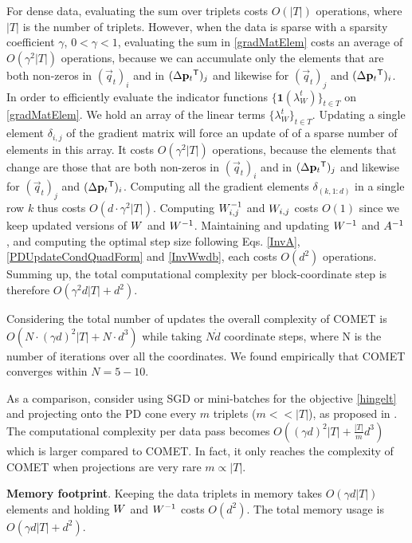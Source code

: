 \documentclass{article}
\begin{document}
For dense data, evaluating the sum over triplets costs $O(|T|)$ operations, where $|T|$ is the number of triplets. However, when the data is sparse with a sparsity coefficient $\gamma$, $ 0< \gamma <1 $, evaluating the sum in \eqref{gradMatElem} costs an average of $O(\gamma^2 |T|)$ operations, because we can accumulate only the elements that are both non-zeros in $(\vec{q}_{t})_i$ and in $(\Delta\mathbf{p}_{t}{}^\mathsf{T})_j  $ and likewise for $(\vec{q}_{t})_j$ and $(\Delta\mathbf{p}_{t}{}^\mathsf{T})_i$.   In order to efficiently evaluate the indicator functions $\{ \textbf{1}(\lambda_{W}^t) \}_{t \in T}$ on \eqref{gradMatElem}. We hold an array of the linear terms $\{\lambda_{W}^t\}_{t \in T}$. Updating a single element $\delta_{i,j}$ of the gradient matrix will force an update of of a sparse number of elements in this array. It costs $O(\gamma^2 |T|)$ operations, because the elements that change are those that are both non-zeros in $(\vec{q}_{t})_i$ and in $(\Delta\mathbf{p}_{t}{}^\mathsf{T})_j$ and likewise for $(\vec{q}_{t})_j$ and $(\Delta\mathbf{p}_{t}{}^\mathsf{T})_i$.
Computing all the gradient elements $\delta_{(k,1:d)}$ in a single row $k$ thus costs $O(d\cdot \gamma^2 |T|)$.
Computing ${W}^{-1}_{i,j}$ and ${W}_{i,j}$ costs $O(1)$ since we keep updated versions of ${W}$ and ${W}^{-1}$.
Maintaining and updating ${W}^{-1}$ and $A^{-1}$, and computing the optimal step size following Eqs. \ref{InvA}, \ref{PDUpdateCondQuadForm} and \ref{InvWwdb}, each costs $O(d^2)$ operations. 
Summing up, the total computational complexity per block-coordinate step is therefore $O(\gamma^2 d |T| + d^2)$.

Considering the total number of updates 
the overall complexity of COMET is $O(N \cdot (\gamma d)^2 |T| + N \cdot d^3)$ while taking $N \dot d$ coordinate steps, where N is the number of iterations over all the coordinates. We found empirically that COMET converges within $N= 5 - 10$.

As a comparison, consider using SGD or mini-batches for the objective \eqref{hingelt} and projecting onto the PD cone every $m$ triplets ($m << |T|$), as proposed in \citet{OASIS,qian}. The computational complexity per data pass becomes $O((\gamma d)^2 |T| + \frac{|T|}{m} d^3)$ which is larger compared to COMET. In fact, it only reaches the complexity of COMET when projections are very rare $m \propto |T|$.


{\bf Memory footprint}. Keeping the data triplets in memory takes $O(\gamma d |T|)$ elements and holding ${W}$ and ${W}^{-1}$ costs $O(d^2)$. The total memory usage is $O(\gamma d |T| + d^2)$. %
\end{document}
